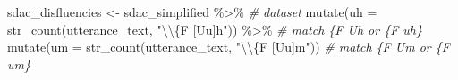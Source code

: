 \documentclass[
]{article}
\newenvironment{Shaded}{\begin{snugshade}}{\end{snugshade}}
\newcommand{\AttributeTok}[1]{\textcolor[rgb]{0.77,0.63,0.00}{#1}}
\newcommand{\CommentTok}[1]{\textcolor[rgb]{0.56,0.35,0.01}{\textit{#1}}}
\newcommand{\FunctionTok}[1]{\textcolor[rgb]{0.00,0.00,0.00}{#1}}
\newcommand{\NormalTok}[1]{#1}
\newcommand{\OtherTok}[1]{\textcolor[rgb]{0.56,0.35,0.01}{#1}}
\newcommand{\SpecialCharTok}[1]{\textcolor[rgb]{0.00,0.00,0.00}{#1}}
\newcommand{\StringTok}[1]{\textcolor[rgb]{0.31,0.60,0.02}{#1}}
\begin{document}
\begin{Shaded}
\begin{Highlighting}[]
\NormalTok{sdac\_disfluencies }\OtherTok{\textless{}{-}} 
\NormalTok{  sdac\_simplified }\SpecialCharTok{\%\textgreater{}\%} \CommentTok{\# dataset}
  \FunctionTok{mutate}\NormalTok{(}\AttributeTok{uh =} \FunctionTok{str\_count}\NormalTok{(utterance\_text, }\StringTok{"}\SpecialCharTok{\textbackslash{}\textbackslash{}}\StringTok{\{F [Uu]h"}\NormalTok{)) }\SpecialCharTok{\%\textgreater{}\%} \CommentTok{\# match \{F Uh or \{F uh\}}
  \FunctionTok{mutate}\NormalTok{(}\AttributeTok{um =} \FunctionTok{str\_count}\NormalTok{(utterance\_text, }\StringTok{"}\SpecialCharTok{\textbackslash{}\textbackslash{}}\StringTok{\{F [Uu]m"}\NormalTok{)) }\CommentTok{\# match \{F Um or \{F um\}}
\end{Highlighting}
\end{Shaded}
\end{document}
